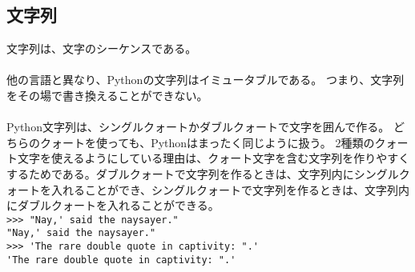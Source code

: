 \documentclass[11pt, oneside]{article}   	%
\begin{document}
\subsection{文字列}
文字列は、文字のシーケンスである。\\
 \\
 他の言語と異なり、Pythonの文字列はイミュータブルである。
 つまり、文字列をその場で書き換えることができない。\\
  \\
Python文字列は、シングルクォートかダブルクォートで文字を囲んで作る。
どちらのクォートを使っても、Pythonはまったく同じように扱う。
2種類のクォート文字を使えるようにしている理由は、クォート文字を含む文字列を作りやすくするためである。ダブルクォートで文字列を作るときは、文字列内にシングルクォートを入れることができ、シングルクォートで文字列を作るときは、文字列内にダブルクォートを入れることができる。\\
\verb|>>> "Nay,' said the naysayer."|\\
\verb|"Nay,' said the naysayer."|\\
\verb|>>> 'The rare double quote in captivity: ".'|\\
\verb|'The rare double quote in captivity: ".'|\\
\end{document}
